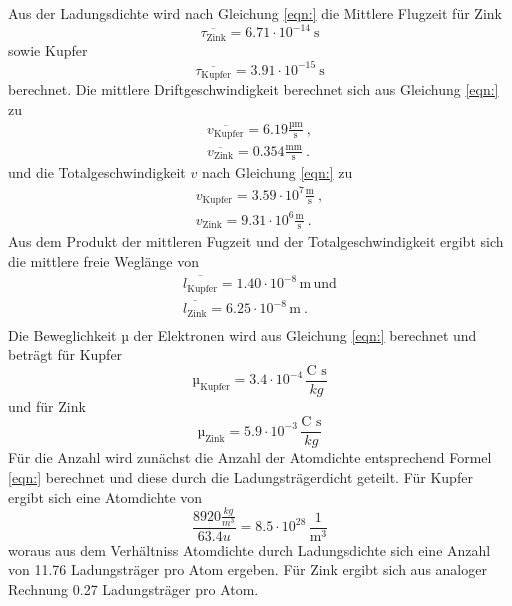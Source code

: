 Aus der Ladungsdichte wird nach Gleichung \ref{eqn:} die Mittlere Flugzeit für Zink
\begin{equation}
  \overline{\tau_\text{Zink}} = 6.71 \cdot 10^{-14} \ \text{s}
  \label{eqn:tZ}
\end{equation}
sowie Kupfer
\begin{equation}
  \overline{\tau_\text{Kupfer}} = 3.91 \cdot 10^{-15} \ \text{s}
    \label{eqn:tK}
\end{equation}
berechnet. Die mittlere Driftgeschwindigkeit  berechnet sich aus Gleichung \ref{eqn:} zu 
\begin{eqnarray}
  \overline{v_\text{Kupfer}} = 6.19 \frac{\text{µm}}{\text{s}} \ , \\
  \overline{v_\text{Zink}} = 0.354 \frac{\text{mm}}{\text{s}} \ .
\end{eqnarray}
und die Totalgeschwindigkeit $v$ nach Gleichung \ref{eqn:} zu
\begin{eqnarray}
  v_\text{Kupfer} = 3.59 \cdot 10^7 \frac{\text{m}}{\text{s}} \ , \\
  v_\text{Zink} = 9.31 \cdot 10^6 \frac{\text{m}}{\text{s}} \ .
\end{eqnarray}
Aus dem Produkt der mittleren Fugzeit und der Totalgeschwindigkeit ergibt sich die mittlere freie Weglänge von 
\begin{eqnarray}
  \overline{l_\text{Kupfer}} = 1.40 \cdot 10^{-8} \, \text{m} \, \text{und} \\
  \overline{l_\text{Zink}} = 6.25 \cdot 10^{-8} \, \text{m} \ .\\
\end{eqnarray}
Die Beweglichkeit $µ$ der Elektronen wird aus Gleichung \ref{eqn:} berechnet und beträgt für Kupfer 
\begin{equation}
  µ_\text{Kupfer} = 3.4 \cdot 10^{-4} \, \frac{\text{C s}}{kg}
\end{equation}
und für Zink
\begin{equation}
  µ_\text{Zink} = 5.9 \cdot 10^{-3} \, \frac{\text{C s}}{kg}
\end{equation}
Für die Anzahl wird zunächst die Anzahl der Atomdichte entsprechend Formel \ref{eqn:} berechnet und diese durch die Ladungsträgerdicht geteilt. Für Kupfer ergibt sich eine Atomdichte von 
\begin{equation}
  \frac{8920 \frac{kg}{m^3}}{63.4 u} = 8.5 \cdot 10^{28} \, \frac{1}{\text{m}^3}
\end{equation} 
woraus aus dem Verhältniss Atomdichte durch Ladungsdichte sich eine Anzahl von 11.76 Ladungsträger pro Atom ergeben. Für Zink ergibt sich aus analoger Rechnung 0.27 Ladungsträger pro Atom.
